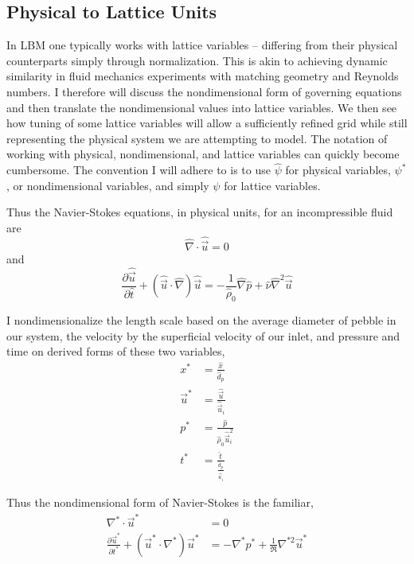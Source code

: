 \subsection{Physical to Lattice Units}\label{sec:physical-to-lattice}
In LBM one typically works with lattice variables -- differing from their physical counterparts simply through normalization. This is akin to achieving dynamic similarity in fluid mechanics experiments with matching geometry and Reynolds numbers. I therefore will discuss the nondimensional form of governing equations and then translate the nondimensional values into lattice variables. We then see how tuning of some lattice variables will allow a sufficiently refined grid while still representing the physical system we are attempting to model. The notation of working with physical, nondimensional, and lattice variables can quickly become cumbersome. The convention I will adhere to is to use $\hat{\psi}$ for physical variables, $\psi^*$, or nondimensional variables, and simply $\psi$ for lattice variables.

Thus the Navier-Stokes equations, in physical units, for an incompressible fluid are
\begin{equation}
	\hat{\nabla}\cdot\hat{\vec{u}} = 0
\end{equation}
and
\begin{equation}
	\frac{\partial \hat{\vec{u}}}{\partial \hat{t}} + (\hat{\vec{u}}\cdot\hat{\nabla})\hat{\vec{u}} = -\frac{1}{\hat{\rho}_0}\hat{\nabla}\hat{p} + \hat{\nu}\hat{\nabla}^2\hat{\vec{u}}
\end{equation}

I nondimensionalize the length scale based on the average diameter of pebble in our system, the velocity by the superficial velocity of our inlet, and pressure and time on derived forms of these two variables,
\begin{subequations}
\begin{align}
	x^* &= \frac{\hat{x}}{\hat{d}_p} \\
	\vec{u}^* &= \frac{\hat{\vec{u}}}{\hat{\vec{u}}_i} \\
	p^* &= \frac{\hat{p}}{\hat{\rho}_0\hat{\vec{u}}_i^2}\\
	t^* &= \frac{\hat{t}}{\frac{\hat{d}_p}{\hat{\vec{u}}_i}}
\end{align}
\end{subequations}

Thus the nondimensional form of Navier-Stokes is the familiar,
\begin{subequations}\label{eq:non-dim-ns}
\begin{align}
	\nabla^* \cdot \vec{u}^* &= 0 \\
	\frac{\partial \vec{u}^*}{\partial t^*} + (\vec{u}^*\cdot\nabla^*)\vec{u}^* &= -\nabla^*p^* + \frac{1}{\Re}\nabla^{*2}\vec{u}^*
\end{align}
\end{subequations}

